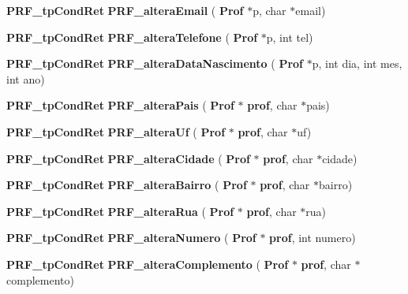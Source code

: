 \begin{DoxyCompactItemize}
\textbf{ P\+R\+F\+\_\+tp\+Cond\+Ret} {\bfseries P\+R\+F\+\_\+altera\+Email} (\textbf{ Prof} $\ast$p, char $\ast$email)
\item 
\mbox{\label{group__modulo_professor_ga37ac35820366b79f9b5b0083208c13dc}} 
\textbf{ P\+R\+F\+\_\+tp\+Cond\+Ret} {\bfseries P\+R\+F\+\_\+altera\+Telefone} (\textbf{ Prof} $\ast$p, int tel)
\item 
\mbox{\label{group__modulo_professor_ga9e270beb77a084a9d5fa97698b738b46}} 
\textbf{ P\+R\+F\+\_\+tp\+Cond\+Ret} {\bfseries P\+R\+F\+\_\+altera\+Data\+Nascimento} (\textbf{ Prof} $\ast$p, int dia, int mes, int ano)
\item 
\mbox{\label{group__modulo_professor_ga5241774acbc42088cde2e703a58cb68c}} 
\textbf{ P\+R\+F\+\_\+tp\+Cond\+Ret} {\bfseries P\+R\+F\+\_\+altera\+Pais} (\textbf{ Prof} $\ast$\textbf{ prof}, char $\ast$pais)
\item 
\mbox{\label{group__modulo_professor_gadd19044d83bb3ce1cb877a0c9d9d0039}} 
\textbf{ P\+R\+F\+\_\+tp\+Cond\+Ret} {\bfseries P\+R\+F\+\_\+altera\+Uf} (\textbf{ Prof} $\ast$\textbf{ prof}, char $\ast$uf)
\item 
\mbox{\label{group__modulo_professor_gabf90cda3e58d71a9369235285adad29e}} 
\textbf{ P\+R\+F\+\_\+tp\+Cond\+Ret} {\bfseries P\+R\+F\+\_\+altera\+Cidade} (\textbf{ Prof} $\ast$\textbf{ prof}, char $\ast$cidade)
\item 
\mbox{\label{group__modulo_professor_gab72e2636c9a86aecf83f2f1b809bac6b}} 
\textbf{ P\+R\+F\+\_\+tp\+Cond\+Ret} {\bfseries P\+R\+F\+\_\+altera\+Bairro} (\textbf{ Prof} $\ast$\textbf{ prof}, char $\ast$bairro)
\item 
\mbox{\label{group__modulo_professor_gaf95c7bac71437487ff099905a3f61590}} 
\textbf{ P\+R\+F\+\_\+tp\+Cond\+Ret} {\bfseries P\+R\+F\+\_\+altera\+Rua} (\textbf{ Prof} $\ast$\textbf{ prof}, char $\ast$rua)
\item 
\mbox{\label{group__modulo_professor_gaefac0fda056d60c7084f44b709239cd4}} 
\textbf{ P\+R\+F\+\_\+tp\+Cond\+Ret} {\bfseries P\+R\+F\+\_\+altera\+Numero} (\textbf{ Prof} $\ast$\textbf{ prof}, int numero)
\item 
\mbox{\label{group__modulo_professor_ga6921749bb963b340ba7df09bb68c5468}} 
\textbf{ P\+R\+F\+\_\+tp\+Cond\+Ret} {\bfseries P\+R\+F\+\_\+altera\+Complemento} (\textbf{ Prof} $\ast$\textbf{ prof}, char $\ast$complemento)
\end{DoxyCompactItemize}
